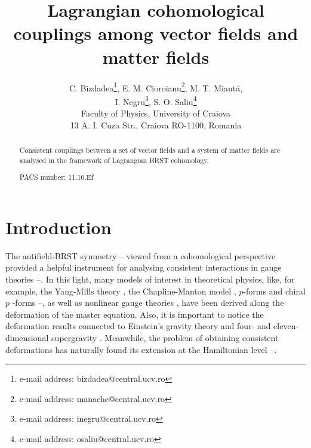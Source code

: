 \documentclass[a4paper,12pt]{article}
\begin{document}
\author{C. Bizdadea\thanks{%
e-mail address: bizdadea@central.ucv.ro},
E. M. Cioroianu\thanks{%
e-mail address: manache@central.ucv.ro},
M. T. Miaut\u {a}, \\
I. Negru\thanks{%
e-mail address: inegru@central.ucv.ro},
S. O. Saliu\thanks{%
e-mail address: osaliu@central.ucv.ro} \\
Faculty of Physics, University of Craiova\\
13 A. I. Cuza Str., Craiova RO-1100, Romania}
\title{Lagrangian cohomological couplings among
vector fields and matter fields}
\maketitle

\begin{abstract}
Consistent couplings between a set of vector
fields and a system of matter
fields are analysed in the framework of
Lagrangian BRST cohomology.

PACS number: 11.10.Ef
\end{abstract}

\section{Introduction}

The antifield-BRST symmetry \cite{1}--\cite{2}
viewed from a cohomological
perspective provided a helpful instrument
for analysing consistent
interactions in gauge theories \cite{3}--\cite{6}.
In this light, many
models of interest in theoretical physics, like,
for example, the Yang-Mills
theory \cite{7}, the Chapline-Manton model \cite{8},
$p$-forms and chiral $p$%
-forms \cite{9}--\cite{13}, as well as nonlinear
gauge theories \cite{13a},
have been derived along the deformation of the
master equation. Also, it is
important to notice the deformation results
connected to Einstein's gravity
theory \cite{14} and four- and eleven-dimensional
supergravity \cite{15}.
Meanwhile, the problem of obtaining consistent
deformations has naturally
found its extension at the Hamiltonian level
\cite{16}--\cite{19}.
\end{document}
